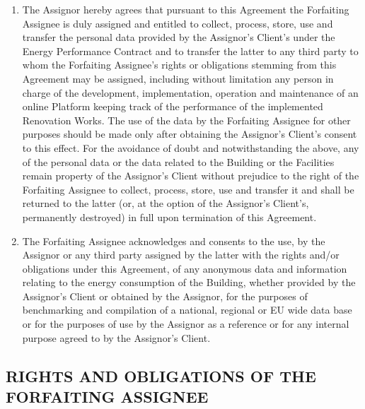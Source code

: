\documentclass[a4paper]{article}
\begin{document}
\begin{multicols}{2}
\begin{enumerate}
  \item{The Assignor hereby agrees that pursuant to this Agreement the
      Forfaiting Assignee is duly assigned and entitled to collect,
      process, store, use and transfer the personal data provided by
      the Assignor's Client’s under the Energy Performance Contract
      and to transfer the latter to any third party to whom the
      Forfaiting Assignee’s rights or obligations stemming from this
      Agreement may be assigned, including without limitation any
      person in charge of the development, implementation, operation
      and maintenance of an online Platform keeping track of the
      performance of the implemented Renovation Works. The use of the
      data by the Forfaiting Assignee for other purposes should be
      made only after obtaining the Assignor's Client’s consent to
      this effect. For the avoidance of doubt and notwithstanding the
      above, any of the personal data or the data related to the
      Building or the Facilities remain property of the Assignor's
      Client without prejudice to the right of the Forfaiting Assignee
      to collect, process, store, use and transfer it and shall be
      returned to the latter (or, at the option of the Assignor's
      Client’s, permanently destroyed) in full upon termination of
      this Agreement.}

  \item{The Forfaiting Assignee acknowledges and consents to the use,
      by the Assignor or any third party assigned by the latter with
      the rights and/or obligations under this Agreement, of any
      anonymous data and information relating to the energy
      consumption of the Building, whether provided by the Assignor's
      Client or obtained by the Assignor, for the purposes of
      benchmarking and compilation of a national, regional or EU wide
      data base or for the purposes of use by the Assignor as a
      reference or for any internal purpose agreed to by the
      Assignor's Client.}
  \end{enumerate}

  \subsection{RIGHTS AND OBLIGATIONS OF THE FORFAITING ASSIGNEE}


\end{multicols}
\end{document}
